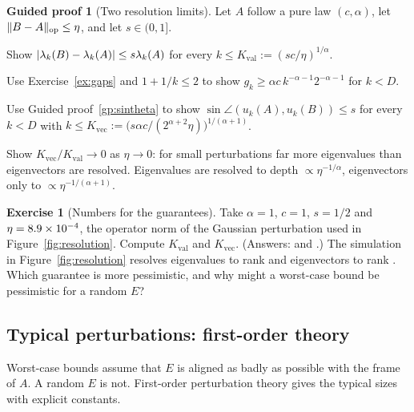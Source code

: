 \documentclass[11pt,a4paper]{article}
\DeclarePairedDelimiter{\norm}{\lVert}{\rVert}
\DeclarePairedDelimiter{\abs}{\lvert}{\rvert}
\newcommand{\op}{\mathrm{op}}
\theoremstyle{plain}
\theoremstyle{definition}
\newtheorem{exercise}[proposition]{Exercise}
\newtheorem{guided}[proposition]{Guided proof}
\theoremstyle{remark}
\begin{document}
\begin{guided}[Two resolution limits]\label{gp:resolution}
Let $A$ follow a pure law $(c,\alpha)$, let $\norm{B-A}_\op\le\eta$, and let $s\in(0,1]$.
\begin{steps}
\item Show $\abs{\lambda_k(B)-\lambda_k(A)}\le s\lambda_k(A)$ for every $k\le K_{\text{val}}:=(sc/\eta)^{1/\alpha}$.
\item Use Exercise~\ref{ex:gaps} and $1+1/k\le2$ to show $g_k\ge\alpha c\,k^{-\alpha-1}2^{-\alpha-1}$ for $k<D$.
\item Use Guided proof~\ref{gp:sintheta} to show $\sin\angle(u_k(A),u_k(B))\le s$ for every $k<D$ with
  $k\le K_{\text{vec}}:=\bigl(s\alpha c/(2^{\alpha+2}\eta)\bigr)^{1/(\alpha+1)}$.
\item Show $K_{\text{vec}}/K_{\text{val}}\to0$ as $\eta\to0$: for small perturbations far more eigenvalues than
  eigenvectors are resolved. Eigenvalues are resolved to depth $\propto\eta^{-1/\alpha}$, eigenvectors only to
  $\propto\eta^{-1/(\alpha+1)}$.
\end{steps}
\end{guided}

\begin{exercise}[Numbers for the guarantees]\label{ex:resnumbers}
Take $\alpha=1$, $c=1$, $s=1/2$ and $\eta=8.9\times10^{-4}$, the operator norm of the Gaussian
perturbation used in Figure~\ref{fig:resolution}. Compute $K_{\text{val}}$ and $K_{\text{vec}}$. (Answers:
\NumKvalWeyl{} and \NumKvecWorst.) The simulation in Figure~\ref{fig:resolution} resolves eigenvalues to rank
\NumKvalSim{} and eigenvectors to rank \NumKvecSim. Which guarantee is more pessimistic, and why might a worst-case
bound be pessimistic for a random $E$?
\end{exercise}

\subsection{Typical perturbations: first-order theory}

Worst-case bounds assume that $E$ is aligned as badly as possible with the frame of $A$. A random $E$ is not. First-order
perturbation theory gives the typical sizes with explicit constants.
\end{document}
